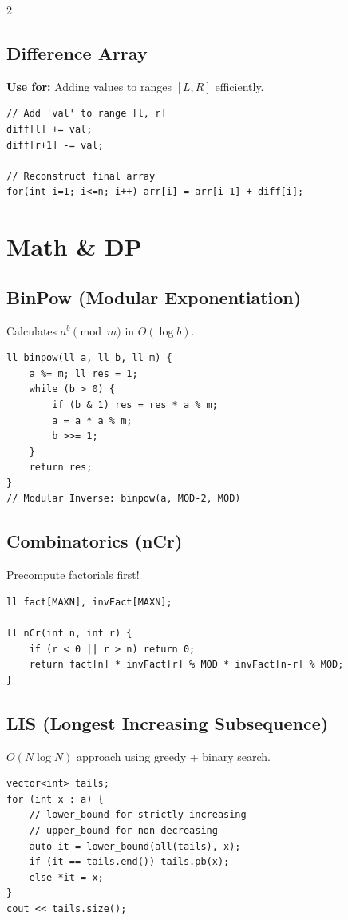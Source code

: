 \documentclass[10pt, letterpaper]{article}
\begin{document}
\begin{multicols}{2}
	\subsection{Difference Array}
	\textbf{Use for:} Adding values to ranges $[L, R]$ efficiently.
	\begin{lstlisting}
// Add 'val' to range [l, r]
diff[l] += val;
diff[r+1] -= val;

// Reconstruct final array
for(int i=1; i<=n; i++) arr[i] = arr[i-1] + diff[i];
\end{lstlisting}

	\section{Math \& DP}

	\subsection{BinPow (Modular Exponentiation)}
	Calculates $a^b \pmod m$ in $O(\log b)$.
	\begin{lstlisting}
ll binpow(ll a, ll b, ll m) {
    a %= m; ll res = 1;
    while (b > 0) {
        if (b & 1) res = res * a % m;
        a = a * a % m;
        b >>= 1;
    }
    return res;
}
// Modular Inverse: binpow(a, MOD-2, MOD)
\end{lstlisting}

	\subsection{Combinatorics (nCr)}
	Precompute factorials first!
	\begin{lstlisting}
ll fact[MAXN], invFact[MAXN];

ll nCr(int n, int r) {
    if (r < 0 || r > n) return 0;
    return fact[n] * invFact[r] % MOD * invFact[n-r] % MOD;
}
\end{lstlisting}

	\subsection{LIS (Longest Increasing Subsequence)}
	$O(N \log N)$ approach using greedy + binary search.
	\begin{lstlisting}
vector<int> tails;
for (int x : a) {
    // lower_bound for strictly increasing
    // upper_bound for non-decreasing
    auto it = lower_bound(all(tails), x);
    if (it == tails.end()) tails.pb(x);
    else *it = x;
}
cout << tails.size();
\end{lstlisting}

\end{multicols}
\end{document}
